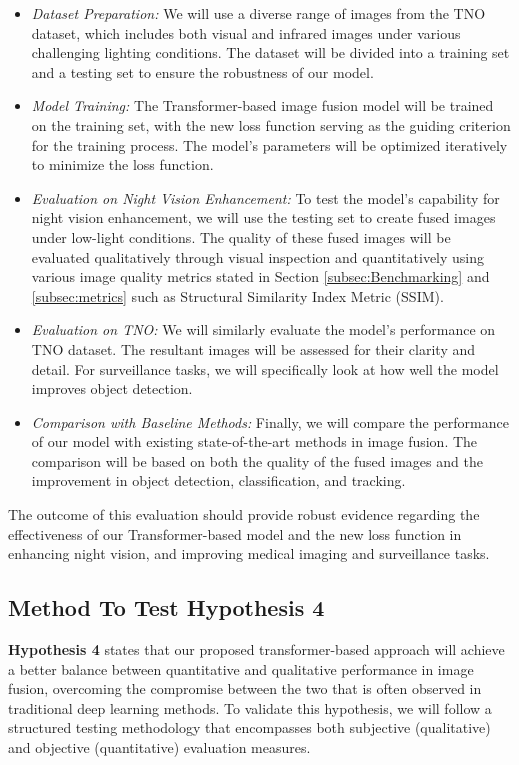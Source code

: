 \begin{itemize}
    \item \textit{Dataset Preparation:} We will use a diverse range of images from the TNO dataset, which includes both visual and infrared images under various challenging lighting conditions. The dataset will be divided into a training set and a testing set to ensure the robustness of our model.
    \item \textit{Model Training:} The Transformer-based image fusion model will be trained on the training set, with the new loss function serving as the guiding criterion for the training process. The model's parameters will be optimized iteratively to minimize the loss function.
    \item \textit{Evaluation on Night Vision Enhancement:} To test the model's capability for night vision enhancement, we will use the testing set to create fused images under low-light conditions. The quality of these fused images will be evaluated qualitatively through visual inspection and quantitatively using various image quality metrics stated in Section \ref{subsec:Benchmarking} and \ref{subsec:metrics} such as Structural Similarity Index Metric (SSIM).
    \item \textit{Evaluation on TNO:} We will similarly evaluate the model's performance on TNO dataset. The resultant images will be assessed for their clarity and detail. For surveillance tasks, we will specifically look at how well the model improves object detection.
    \item \textit{Comparison with Baseline Methods:} Finally, we will compare the performance of our model with existing state-of-the-art methods in image fusion. The comparison will be based on both the quality of the fused images and the improvement in object detection, classification, and tracking.
\end{itemize}

The outcome of this evaluation should provide robust evidence regarding the effectiveness of our Transformer-based model and the new loss function in enhancing night vision, and improving medical imaging and surveillance tasks.

\subsection{Method To Test Hypothesis 4} \label{subsec:met5}

\textbf{Hypothesis 4} states that our proposed transformer-based approach will achieve a better balance between quantitative and qualitative performance in image fusion, overcoming the compromise between the two that is often observed in traditional deep learning methods. To validate this hypothesis, we will follow a structured testing methodology that encompasses both subjective (qualitative) and objective (quantitative) evaluation measures.

